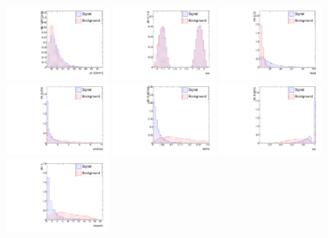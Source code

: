 \begin{figure}
  \centering
  \includegraphics[width=0.3\textwidth]{Figures/pt_endcaps}
  \includegraphics[width=0.3\textwidth]{Figures/eta_endcaps}
  \includegraphics[width=0.3\textwidth]{Figures/fls3d_endcaps}
  \includegraphics[width=0.3\textwidth]{Figures/chi2dof_endcaps}
  \includegraphics[width=0.3\textwidth]{Figures/alpha_endcaps}
  \includegraphics[width=0.3\textwidth]{Figures/iso_endcaps}
  \includegraphics[width=0.3\textwidth]{Figures/closetrk_endcaps}

\end{figure}
